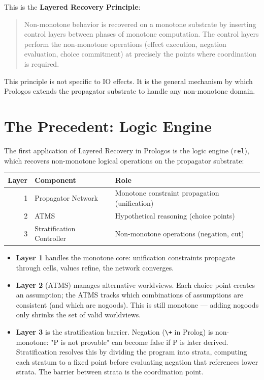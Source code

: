 \documentclass[11pt]{article}
\begin{document}
This is the \textbf{Layered Recovery Principle}:

\begin{quote}
Non-monotone behavior is recovered on a monotone substrate by inserting control
layers between phases of monotone computation. The control layers perform the
non-monotone operations (effect execution, negation evaluation, choice
commitment) at precisely the points where coordination is required.
\end{quote}

This principle is not specific to IO effects. It is the general mechanism by
which Prologos extends the propagator substrate to handle any non-monotone
domain.
\section{The Precedent: Logic Engine}
\label{sec:org3934151}

The first application of Layered Recovery in Prologos is the logic engine
(\texttt{rel}), which recovers non-monotone logical operations on the propagator
substrate:

\begin{center}
\begin{tabular}{rll}
Layer & Component & Role\\
\hline
1 & Propagator Network & Monotone constraint propagation (unification)\\
2 & ATMS & Hypothetical reasoning (choice points)\\
3 & Stratification Controller & Non-monotone operations (negation, cut)\\
\end{tabular}
\end{center}

\begin{itemize}
\item \textbf{Layer 1} handles the monotone core: unification constraints propagate through
cells, values refine, the network converges.
\item \textbf{Layer 2} (ATMS) manages alternative worldviews. Each choice point creates an
assumption; the ATMS tracks which combinations of assumptions are consistent
(and which are nogoods). This is still monotone --- adding nogoods only
shrinks the set of valid worldviews.
\item \textbf{Layer 3} is the stratification barrier. Negation (\texttt{\textbackslash{}+} in Prolog) is
non-monotone: "P is not provable" can become false if P is later derived.
Stratification resolves this by dividing the program into strata, computing
each stratum to a fixed point before evaluating negation that references
lower strata. The barrier between strata is the coordination point.
\end{itemize}
\end{document}

